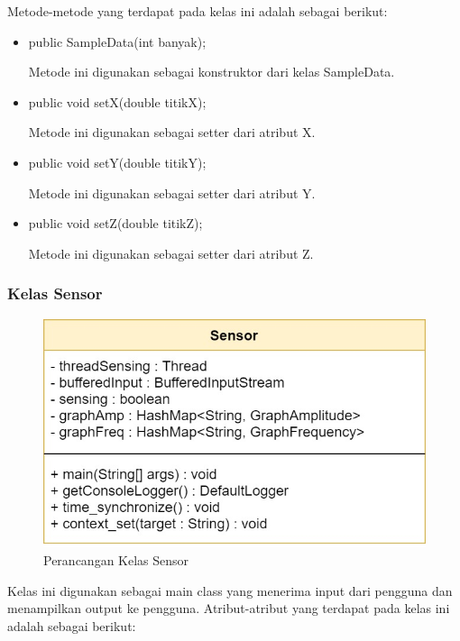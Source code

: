 Metode-metode yang terdapat pada kelas ini adalah sebagai berikut:
\begin{itemize}
    \item public SampleData(int banyak);
    
    Metode ini digunakan sebagai konstruktor dari kelas SampleData.
    
    \item public void setX(double titikX);
    
    Metode ini digunakan sebagai setter dari atribut X.
    
    \item public void setY(double titikY);
    
    Metode ini digunakan sebagai setter dari atribut Y.
    
    \item public void setZ(double titikZ);
    
    Metode ini digunakan sebagai setter dari atribut Z.
    
\end{itemize}

\subsubsection{Kelas Sensor}
\begin{figure}[H] 
	\centering  
	\includegraphics[scale=0.35]{Gambar/Controller Package/Controller-Sensor.jpg}
	\caption[Perancangan Kelas Sensor]{Perancangan Kelas Sensor}
	\label{fig:controller_sensor} 
\end{figure}
Kelas ini digunakan sebagai main class yang menerima input dari pengguna dan menampilkan output ke pengguna. Atribut-atribut yang terdapat pada kelas ini adalah sebagai berikut:

